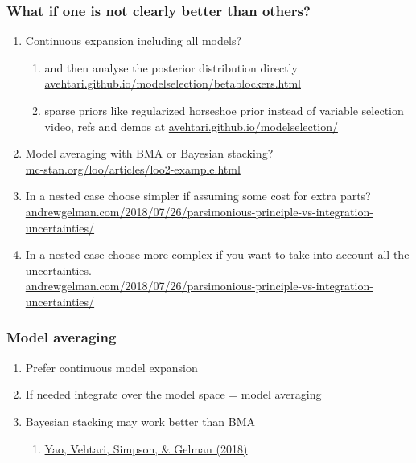 \documentclass[10pt]{beamer}
\begin{document}
\begin{frame}{}

\frametitle{What if one is not clearly better than others?}

  \begin{enumerate}
  \item<2-> Continuous expansion including all models?
    \begin{enumerate}
    \item and then analyse the posterior distribution directly\\
        {\small \url{avehtari.github.io/modelselection/betablockers.html}}
      \item sparse priors like regularized horseshoe prior instead of variable selection\\
        {\small video, refs and demos at
          \url{avehtari.github.io/modelselection/}}
    \end{enumerate}
  \item<3-> Model averaging with BMA or Bayesian stacking?\\
    {\small \url{mc-stan.org/loo/articles/loo2-example.html}}
  \item<4-> In a nested case choose simpler if assuming some cost for
    extra parts?\\
    {\small \url{andrewgelman.com/2018/07/26/parsimonious-principle-vs-integration-uncertainties/}}
  \item<5-> In a nested case choose more complex if you want to take
    into account all the uncertainties.\\
    {\small \url{andrewgelman.com/2018/07/26/parsimonious-principle-vs-integration-uncertainties/}}
  \end{enumerate}

\end{frame}

\begin{frame}

\frametitle{Model averaging}

  \begin{enumerate}
  \item<+-> Prefer continuous model expansion
  \item<+-> If needed integrate over the model space = model averaging
  \item<+-> Bayesian stacking may work better than BMA
    \begin{enumerate}
    \item \href{https://projecteuclid.org/euclid.ba/1516093227}{Yao, Vehtari, Simpson, \& Gelman (2018)}
    \end{enumerate}
  \end{enumerate}

\end{frame}
\end{document}

